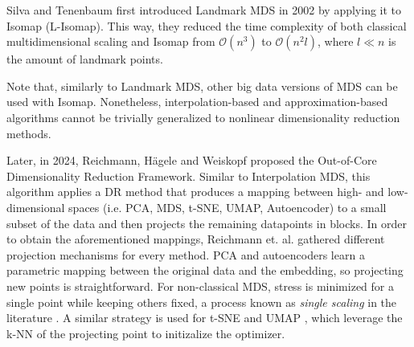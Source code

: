 Silva and Tenenbaum \cite{deSilvaTenenbaum2002} first introduced Landmark MDS in 2002 by applying it to Isomap (L-Isomap). This way, they reduced the time complexity of both classical multidimensional scaling and Isomap from $\mathcal{O}(n^3)$ to $\mathcal{O}(n^2l)$, where $l \ll n$ is the amount of landmark points.

Note that, similarly to Landmark MDS, other big data versions of MDS can be used with Isomap. Nonetheless, interpolation-based and approximation-based algorithms cannot be trivially generalized to nonlinear dimensionality reduction methods.

Later, in 2024, Reichmann, Hägele and Weiskopf \cite{reichmann2024outofcoredimensionalityreductionlarge} proposed the Out-of-Core Dimensionality Reduction Framework. Similar to Interpolation MDS, this algorithm applies a DR method that produces a mapping between high- and low-dimensional spaces (i.e. PCA, MDS, t-SNE, UMAP, Autoencoder) to a small subset of the data and then projects the remaining datapoints in blocks. In order to obtain the aforementioned mappings, Reichmann et. al. gathered different projection mechanisms for every method. PCA and autoencoders learn a parametric mapping between the original data and the embedding, so projecting new points is straightforward. For non-classical MDS, stress is minimized for a single point while keeping others fixed, a process known as \textit{single scaling} in the literature \cite{single-scaling}. A similar strategy is used for t-SNE \cite{tsne-knn} and UMAP \cite{McInnes2018}, which leverage the k-NN of the projecting point to initizalize the optimizer.